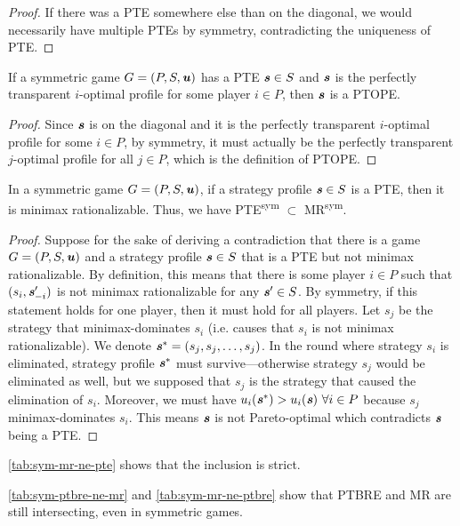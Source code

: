 \begin{proof}
	If there was a PTE somewhere else than on the diagonal, we would necessarily have multiple PTEs by symmetry, contradicting the uniqueness of PTE.
\end{proof}

\begin{corollary}
	If a symmetric game $G = (P, S, \boldsymbol{\mathit{u}})$ has a PTE $\boldsymbol{\mathit{s}} \in S$ and $\boldsymbol{\mathit{s}}$ is the perfectly transparent $i$-optimal profile for some player $i \in P$, then $\boldsymbol{\mathit{s}}$ is a PTOPE. 
\end{corollary}

\begin{proof}
	Since $\boldsymbol{\mathit{s}}$ is on the diagonal and it is the perfectly transparent $i$-optimal profile for some $i \in P$, by symmetry, it must actually be the perfectly transparent $j$-optimal profile for all $j \in P$, which is the definition of PTOPE.
\end{proof}

\begin{lemma}
	\label{th:pte-sym-subset-mr}
	In a symmetric game $G = (P, S, \boldsymbol{\mathit{u}})$, if a strategy profile $\boldsymbol{\mathit{s}} \in S$ is a PTE, then it is minimax rationalizable.
	Thus, we have PTE\textsuperscript{sym} $\subset$ MR\textsuperscript{sym}.
\end{lemma}

\begin{proof}
	Suppose for the sake of deriving a contradiction that there is a game $G = (P, S, \boldsymbol{\mathit{u}})$ and a strategy profile $\boldsymbol{\mathit{s}} \in S$ that is a PTE but not minimax rationalizable.
	By definition, this means that there is some player $i \in P$ such that $(s_i, \boldsymbol{\mathit{s}}_{-i}')$ is not minimax rationalizable for any $\boldsymbol{\mathit{s}}' \in S$.
	By symmetry, if this statement holds for one player, then it must hold for all players.
	Let $s_j$ be the strategy that minimax-dominates $s_i$ (i.e. causes that $s_i$ is not minimax rationalizable).
	We denote $\boldsymbol{\mathit{s}}^* = (s_j, s_j, \dots, s_j)$.
	In the round where strategy $s_i$ is eliminated, strategy profile $\boldsymbol{\mathit{s}}^*$ must survive---otherwise strategy $s_j$ would be eliminated as well, but we supposed that $s_j$ is the strategy that caused the elimination of $s_i$.
	Moreover, we must have $u_i(\boldsymbol{\mathit{s}}^*) > u_i(\boldsymbol{\mathit{s}})\ \forall i \in P$ because $s_j$ minimax-dominates $s_i$.
	This means $\boldsymbol{\mathit{s}}$ is not Pareto-optimal which contradicts $\boldsymbol{\mathit{s}}$ being a PTE.
\end{proof}

\begin{remark}
	\autoref{tab:sym-mr-ne-pte} shows that the inclusion is strict.
\end{remark}

\begin{remark}
	\autoref{tab:sym-ptbre-ne-mr} and \autoref{tab:sym-mr-ne-ptbre} show that PTBRE and MR are still intersecting, even in symmetric games.
\end{remark}
